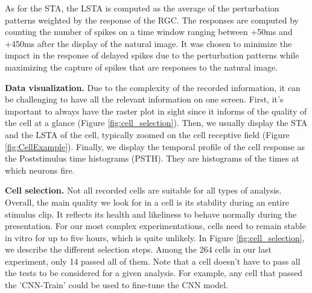 As for the STA, the LSTA is computed as the average of the perturbation
patterns weighted by the response of the RGC. The responses are computed by
counting the number of spikes on a time window ranging between +50ms and +450ms
after the display of the natural image. It was chosen to minimize the impact in
the response of delayed spikes due to the perturbation patterns while
maximizing
the capture of spikes that are responses to the natural image.

\textbf{Data visualization.}
Due to the complexity of the recorded information, it can be challenging to
have
all the relevant information on one screen. First, it's important to always
have the raster plot in sight since it informs of the quality of the cell at a
glance (Figure \ref{fig:cell_selection}).
Then, we usually display the STA and the LSTA of the cell, typically zoomed on
the cell receptive field (Figure \ref{fig:CellExample}).
Finally, we display the temporal profile of the cell response as the
Poststimulus time histograms
(PSTH). They are histograms of the times at which neurons fire.



\textbf{Cell selection.}
Not all recorded cells are suitable for all types of analysis. Overall, the
main quality we look for in a cell is its stability during an entire stimulus
clip.
It reflects its health and likeliness to behave normally during the
presentation. For our most complex experimentations, cells need to remain
stable in vitro for up to five hours, which is quite unlikely. In Figure
\ref{fig:cell_selection}, we
describe the different selection steps. Among the 264 cells
in our last experiment, only 14 passed all of them. Note that a cell doesn't
have to
pass all the tests to be considered for a given analysis. For example, any cell
that passed the 'CNN-Train' could be used to fine-tune the CNN model.

